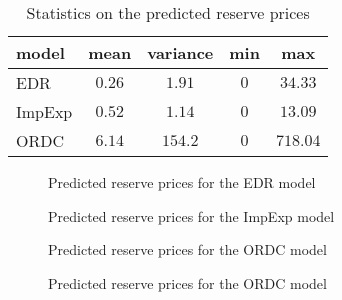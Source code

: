 \begin{table}[H]
\centering
\begin{tabular}{l | c  c  c  c}
model & mean & variance & min & max \\
\hline
EDR & $0.26$ &  $1.91$ & $0$ &  $34.33$ \\
ImpExp & $0.52$ &  $1.14$ & $0$ &  $13.09$ \\
ORDC & $ 6.14$ & $154.2$ & $0$ & $718.04$ \\
\end{tabular}
\caption{Statistics on the predicted reserve prices}
\end{table}

\begin{figure}[H]
    \centering
    \setlength{}
    \setlength{}
    
    \caption{Predicted reserve prices for the EDR model}
    \label{fig:EDR_R}
\end{figure}

\begin{figure}[H]
    \centering
    \setlength{}
    \setlength{}
    
    \caption{Predicted reserve prices for the ImpExp model}
    \label{fig:ImpExp_R}
\end{figure}

\begin{figure}[H]
    \centering
    \setlength{}
    \setlength{}
    
    \caption{Predicted reserve prices for the ORDC model}
    \label{fig:ORDC_R1}
\end{figure}

\begin{figure}[H]
    \centering
    \setlength{}
    \setlength{}
    
    \caption{Predicted reserve prices for the ORDC model}
    \label{fig:ORDC_R2}
\end{figure}